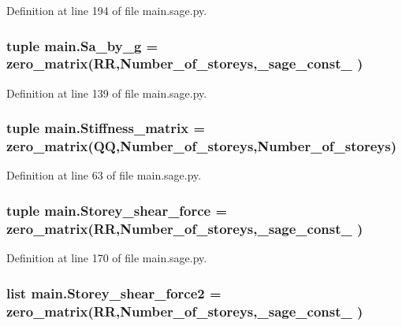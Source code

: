 Definition at line 194 of file main.\+sage.\+py.

\hypertarget{namespacemain_ac3a509169246622b50fc23d809d30833}{}
\subsubsection[{Sa\+\_\+by\+\_\+g}]{\setlength{\rightskip}{0pt plus 5cm}tuple main.\+Sa\+\_\+by\+\_\+g = zero\+\_\+matrix(R\+R,Number\+\_\+of\+\_\+storeys,\+\_\+sage\+\_\+const\+\_ )}\label{namespacemain_ac3a509169246622b50fc23d809d30833}


Definition at line 139 of file main.\+sage.\+py.

\hypertarget{namespacemain_a0011be18dbc87087d6aaf28802f121c0}{}
\subsubsection[{Stiffness\+\_\+matrix}]{\setlength{\rightskip}{0pt plus 5cm}tuple main.\+Stiffness\+\_\+matrix = zero\+\_\+matrix(Q\+Q,Number\+\_\+of\+\_\+storeys,Number\+\_\+of\+\_\+storeys)}\label{namespacemain_a0011be18dbc87087d6aaf28802f121c0}


Definition at line 63 of file main.\+sage.\+py.

\hypertarget{namespacemain_aaa52e7055409dcf0785880422294a704}{}
\subsubsection[{Storey\+\_\+shear\+\_\+force}]{\setlength{\rightskip}{0pt plus 5cm}tuple main.\+Storey\+\_\+shear\+\_\+force = zero\+\_\+matrix(R\+R,Number\+\_\+of\+\_\+storeys,\+\_\+sage\+\_\+const\+\_ )}\label{namespacemain_aaa52e7055409dcf0785880422294a704}


Definition at line 170 of file main.\+sage.\+py.

\hypertarget{namespacemain_ab6dd9cc05fd903a9da8b9734c44fef57}{}
\subsubsection[{Storey\+\_\+shear\+\_\+force2}]{\setlength{\rightskip}{0pt plus 5cm}list main.\+Storey\+\_\+shear\+\_\+force2 = zero\+\_\+matrix(R\+R,Number\+\_\+of\+\_\+storeys,\+\_\+sage\+\_\+const\+\_ )}\label{namespacemain_ab6dd9cc05fd903a9da8b9734c44fef57}


